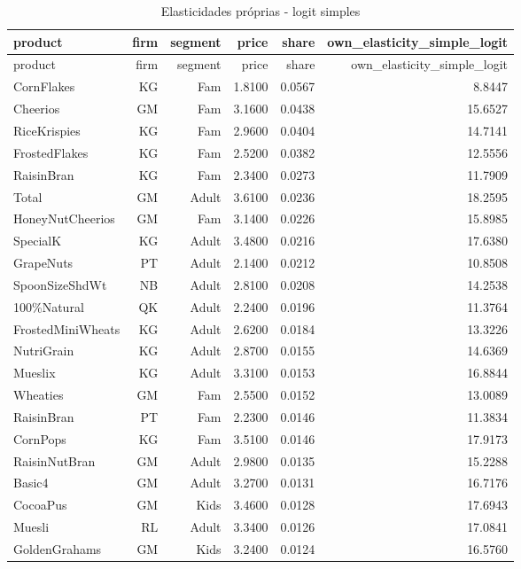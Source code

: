 \begingroup
\scriptsize
\begin{longtable}{@{}lrrrrr@{}}
\caption{Elasticidades próprias - logit simples}\label{tab:own-elas-simple}\\
\toprule
product & firm & segment & price & share & own\_elasticity\_simple\_logit \\
\midrule
\endfirsthead
\toprule
product & firm & segment & price & share & own\_elasticity\_simple\_logit \\
\midrule
\endhead
CornFlakes & KG & Fam & 1.8100 & 0.0567 & 8.8447 \\
Cheerios & GM & Fam & 3.1600 & 0.0438 & 15.6527 \\
RiceKrispies & KG & Fam & 2.9600 & 0.0404 & 14.7141 \\
FrostedFlakes & KG & Fam & 2.5200 & 0.0382 & 12.5556 \\
RaisinBran & KG & Fam & 2.3400 & 0.0273 & 11.7909 \\
Total & GM & Adult & 3.6100 & 0.0236 & 18.2595 \\
HoneyNutCheerios & GM & Fam & 3.1400 & 0.0226 & 15.8985 \\
SpecialK & KG & Adult & 3.4800 & 0.0216 & 17.6380 \\
GrapeNuts & PT & Adult & 2.1400 & 0.0212 & 10.8508 \\
SpoonSizeShdWt & NB & Adult & 2.8100 & 0.0208 & 14.2538 \\
100\%Natural & QK & Adult & 2.2400 & 0.0196 & 11.3764 \\
FrostedMiniWheats & KG & Adult & 2.6200 & 0.0184 & 13.3226 \\
NutriGrain & KG & Adult & 2.8700 & 0.0155 & 14.6369 \\
Mueslix & KG & Adult & 3.3100 & 0.0153 & 16.8844 \\
Wheaties & GM & Fam & 2.5500 & 0.0152 & 13.0089 \\
RaisinBran & PT & Fam & 2.2300 & 0.0146 & 11.3834 \\
CornPops & KG & Fam & 3.5100 & 0.0146 & 17.9173 \\
RaisinNutBran & GM & Adult & 2.9800 & 0.0135 & 15.2288 \\
Basic4 & GM & Adult & 3.2700 & 0.0131 & 16.7176 \\
CocoaPus & GM & Kids & 3.4600 & 0.0128 & 17.6943 \\
Muesli & RL & Adult & 3.3400 & 0.0126 & 17.0841 \\
GoldenGrahams & GM & Kids & 3.2400 & 0.0124 & 16.5760 \\

\end{longtable}
